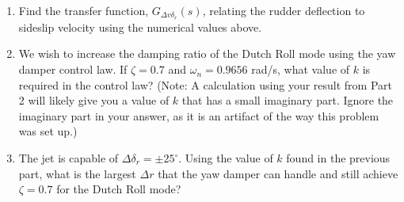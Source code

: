 \begin{question}
\begin{enumerate}
    \item Find the transfer function, $G_{\Delta v \delta_r}(s)$, relating the rudder deflection to sideslip velocity using the numerical values above.

        \item We wish to increase the damping ratio of the Dutch Roll mode using the yaw damper control law. If $\zeta = 0.7$ and $\omega_n = 0.9656$ rad/s, what value of $k$ is required in the control law? (Note: A calculation using your result from Part 2 will likely give you a value of $k$ that has a small imaginary part. Ignore the imaginary part in your answer, as it is an artifact of the way this problem was set up.)
        \item The jet is capable of $\Delta \delta_r = \pm 25^\circ$. Using the value of $k$ found in the previous part, what is the largest $\Delta r$ that the yaw damper can handle and still achieve $\zeta = 0.7$ for the Dutch Roll mode? 
    \end{enumerate}
\end{question}
